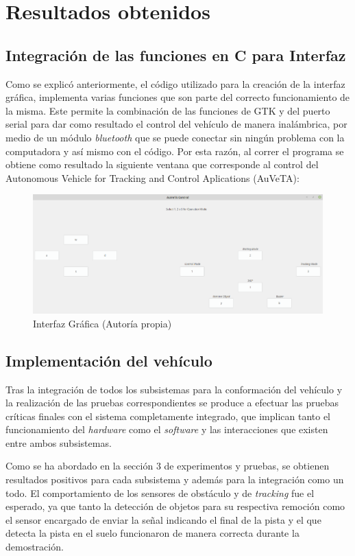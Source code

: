 \section{Resultados obtenidos}
\subsection{Integración de las funciones en C para Interfaz}
Como se explicó anteriormente, el código utilizado para la creación de la interfaz gráfica, implementa varias funciones que son parte del correcto funcionamiento de la misma. Este permite la combinación de las funciones de GTK y del puerto serial para dar como resultado el control del vehículo de manera inalámbrica, por medio de un módulo \textit{bluetooth} que se puede conectar sin ningún problema con la computadora y así mismo con el código. Por esta razón, al correr el programa se obtiene como resultado la siguiente ventana que corresponde al control del Autonomous Vehicle for Tracking and Control Aplications (AuVeTA):
\begin{figure}[H]
    \centering
    \includegraphics[width = 14cm]{imagenes/interfaz.png}
    \caption{Interfaz Gráfica (Autoría propia)}
    
\end{figure}

\subsection{Implementación del vehículo}
Tras la integración de todos los subsistemas para la conformación del vehículo y la realización de las pruebas correspondientes se produce a efectuar las pruebas críticas finales con el sistema completamente integrado, que implican tanto el funcionamiento del \textit{hardware} como el \textit{software} y las interacciones que existen entre ambos subsistemas. 

Como se ha abordado en la sección 3 de experimentos y pruebas, se obtienen resultados positivos para cada subsistema y además para la integración como un todo. El comportamiento de los sensores de obstáculo y de \textit{tracking} fue el esperado, ya que tanto la detección de objetos para su respectiva remoción como el sensor encargado de enviar la señal indicando el final de la pista y el que detecta la pista en el suelo funcionaron de manera correcta durante la demostración.

